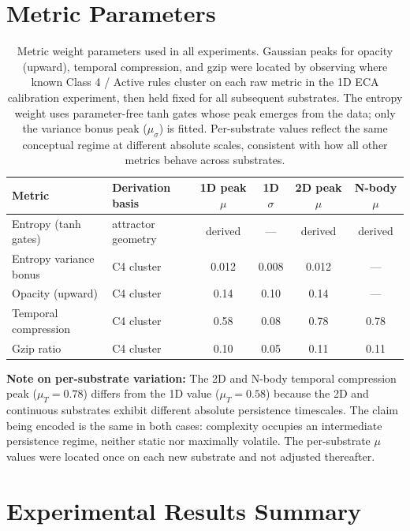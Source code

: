 \documentclass[12pt,a4paper]{article}
\begin{document}
\section{Metric Parameters}

\begin{table}[h]
\centering
\caption{%
  Metric weight parameters used in all experiments.
  Gaussian peaks for opacity (upward), temporal compression, and gzip
  were located by observing where known Class 4 / Active rules cluster
  on each raw metric in the 1D ECA calibration experiment, then held
  fixed for all subsequent substrates.
  The entropy weight uses parameter-free tanh gates whose peak emerges
  from the data; only the variance bonus peak ($\mu_\sigma$) is fitted.
  Per-substrate values reflect the same conceptual regime at different
  absolute scales, consistent with how all other metrics behave across
  substrates.
}
\begin{tabular}{llcccc}
\toprule
Metric & Derivation basis & 1D peak $\mu$ & 1D $\sigma$ & 2D peak $\mu$ & N-body $\mu$ \\
\midrule
Entropy (tanh gates) & attractor geometry   & derived & ---  & derived & derived \\
Entropy variance bonus & C4 cluster         & 0.012 & 0.008 & 0.012 & --- \\
Opacity (upward)    & C4 cluster            & 0.14  & 0.10  & 0.14  & --- \\
Temporal compression & C4 cluster           & 0.58  & 0.08  & 0.78  & 0.78 \\
Gzip ratio          & C4 cluster            & 0.10  & 0.05  & 0.11  & 0.11 \\
\bottomrule
\end{tabular}
\end{table}

\noindent\textbf{Note on per-substrate variation:} The 2D and N-body
temporal compression peak ($\mu_T = 0.78$) differs from the 1D value
($\mu_T = 0.58$) because the 2D and continuous substrates exhibit
different absolute persistence timescales.
The claim being encoded is the same in both cases: complexity occupies
an intermediate persistence regime, neither static nor maximally volatile.
The per-substrate $\mu$ values were located once on each new substrate
and not adjusted thereafter.

\section{Experimental Results Summary}
\end{document}
